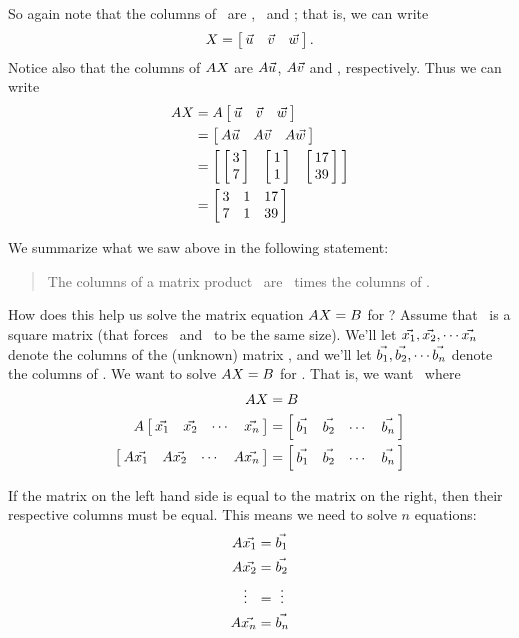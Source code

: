 So again note that the columns of \ttx\ are \vu, \vv\ and \vw; that is, we can write $$\ttx = \bmx{ccc}\vu & \vv&\vw \emx.$$
Notice also that the columns of $\tta\ttx$ are $\tta\vu$, $\tta\vv$ and \tta\vw, respectively. Thus we can write 
\begin{align*}\tta\ttx &= \tta\bmx{ccc}\vu & \vv&\vw \emx\\
&=\bmx{ccc} \tta\vu & \tta\vv & \tta\vw \emx\\
 &= \bmx{ccc} \bmx{c}3\\7\emx & \bmx{c} 1\\1\emx & \bmx{c}17\\39\emx \emx \\
 &=\bmx{ccc}3&1&17\\7&1&39\emx\end{align*}
 
We summarize what we saw above in the following statement: 
\begin{quote}
 The columns of a matrix product \tta\ttx\  are \tta\ times the columns of \ttx.
\end{quote}

How does this help us solve the matrix equation $\tta\ttx=\ttb$ for \ttx? Assume that \tta\ is a square matrix (that forces \ttx\ and \ttb\ to be the same size). We'll let $\vect{x_1},\vect{x_2}, \cdots \vect{x_n}$ denote the columns of the (unknown) matrix \ttx, and we'll let $\vect{b_1},\vect{b_2}, \cdots \vect{b_n}$ denote the columns of \ttb. We want to solve $\tta\ttx = \ttb$ for \ttx. That is, we want \ttx\ where 
\begin{align*} \tta\ttx &= \ttb\\
\tta\bmx{cccc}\vect{x_1}&\vect{x_2}& \cdots & \vect{x_n} \emx & = \bmx{cccc}\vect{b_1}&\vect{b_2}& \cdots & \vect{b_n} \emx\\
\bmx{cccc}\tta\vect{x_1}&\tta\vect{x_2}& \cdots & \tta\vect{x_n} \emx & = \bmx{cccc}\vect{b_1}&\vect{b_2}& \cdots & \vect{b_n} \emx\end{align*}

If the matrix on the left hand side is equal to the matrix on the right, then their respective columns must be equal. This means we need to solve $n$ equations:
\begin{align*}
\tta\vect{x_1} & = \vect{b_1}\\
\tta\vect{x_2} & = \vect{b_2}\\
\vdots\		\		& = \ \vdots \\
\tta\vect{x_n} &= \vect{b_n}
\end{align*}

